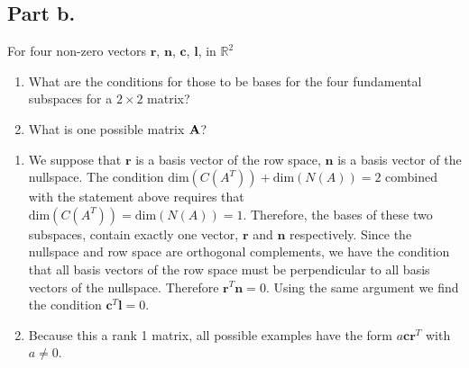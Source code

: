 \subsection{Part b.}
For four non-zero vectors $\mathbf{r}$, $\mathbf{n}$, $\mathbf{c}$,
$\mathbf{l}$, in $\mathbb{R}^{2}$
\begin{enumerate}[label=(\alph*)]
    \item What are the conditions for those to be bases for the four
        fundamental subspaces for a $2 \times 2$ matrix?
    \item What is one possible matrix $\mathbf{A}$?
\end{enumerate}
\begin{mdframed}[style=MyFrame]
    \begin{enumerate}[label=(\alph*)]
        \item We suppose that $\mathbf{r}$ is a basis vector of the row space, $\mathbf{n}$
            is a basis vector of the nullspace. The condition 
            $\text{dim}(C(A^{T})) +\text{dim}(N(A)) =2 $ 
            combined with the statement above
            requires that 
            $\text{dim}(C(A^{T}))=\text{dim}(N(A))=1$. 
            Therefore, the bases of these two subspaces, contain exactly
            one vector, $\mathbf{r}$ and $\mathbf{n}$ respectively. Since the nullspace and
            row space are orthogonal complements, we have the condition
            that all basis vectors of the row space must be perpendicular
            to all basis vectors of the nullspace. Therefore $\mathbf{r}^{T}\mathbf{n}=0$.
            Using the same argument we find the condition
            $\mathbf{c}^{T}\mathbf{l}=0$.

        \item Because this a rank 1 matrix, all possible examples have the
            form $a\mathbf{c}\mathbf{r}^{T}$ with $a \ne 0$.
    \end{enumerate}
\end{mdframed}



